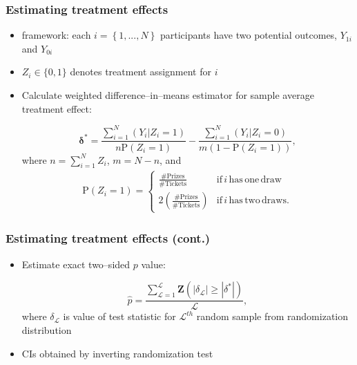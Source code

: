 \documentclass{beamer}
\makeatletter
\newtheorem*{assumption*}{\assumptionnumber}
\providecommand{\assumptionnumber}{}
\newenvironment{assumption}[2]
 {%
  \renewcommand{\assumptionnumber}{Assumption #1}%
  \begin{assumption*}%
  \protected@edef\@currentlabel{#1}%
 }
 {%
  \end{assumption*}
 }
\makeatother
\begin{document}
\begin{frame}
\frametitle{Estimating treatment effects}
\begin{itemize}
\item \citet{neyman1923} framework: each $i = \left\{1, ..., N \right\}$ participants have two potential outcomes, $Y_{1i}$ and $Y_{0i}$
\item  $Z_i \in \{0,1\}$ denotes treatment assignment for $i$
\item Calculate weighted difference--in--means estimator for sample average treatment effect:

\begin{equation} \label{tstat}
\boldsymbol \delta^{*} = \frac{\sum_{i=1}^{N} (Y_{i} | Z_i = 1)}{n \mathrm{P} (Z_i = 1)}  -  \frac{\sum_{i=1}^{N} (Y_{i} | Z_i = 0)}{m(1-\mathrm{P} (Z_i = 1))},
\end{equation} where $n = \sum_{i=1}^{N} Z_i$, $m = N- n$, and 
\begin{align} \label{Z} 
\mathrm{P} (Z_i = 1) = \begin{cases}
\frac{\# \mathrm{Prizes}}{\# \mathrm{Tickets}} 	& \mbox{if} \, i \, \mathrm{has \, one \, draw}  \\
2 \left(\frac{\# \mathrm{Prizes}}{\# \mathrm{Tickets}}\right) 	& \mbox{if}\, i \, \mathrm{has \, two \, draws}.
\end{cases} 
\end{align} 
\end{itemize}
\end{frame}

\begin{frame}
\frametitle{Estimating treatment effects (cont.)}
\begin{itemize}
\begin{assumption}{1}{}\label{a1}
No interference between units: $Y_{i\boldsymbol Z}$ varies with $Z_i$, but does not vary with other elements of \textbf{Z}.
\end{assumption} 

\begin{assumption}{2}{}\label{a2}
Random treatment assignment: $\mathrm{P}(Z_i | Y_{i\boldsymbol Z}) = \mathrm{P}(Z_i)$ for all $i$. 
\end{assumption} 

\item Estimate exact two--sided $p$ value:

\begin{equation} \label{p} 
\hat{p} = \frac{\sum_{\mathcal{L}=1}^{\mathcal{L}} \boldsymbol Z \left(|\delta_\mathcal{L}| \geq |\delta^{*}|\right)}{\mathcal{L}},
\end{equation} where $\delta_\mathcal{L}$ is value of test statistic for $\mathcal{L}^{th}$ random sample from randomization distribution
\item CIs obtained by inverting randomization test
\end{itemize}
\end{frame}
\end{document}
